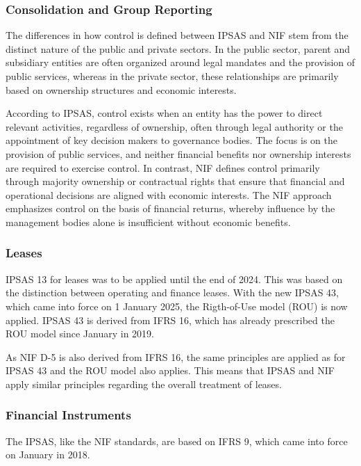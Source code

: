 \documentclass[10pt]{article}
\begin{document}
\subsubsection{Consolidation and Group Reporting}\label{subsubsec:consolidation_and_group_reporting}
The differences in how control is defined between IPSAS and NIF stem from the distinct nature of the public and private sectors. In the public sector, parent and subsidiary entities are often organized around legal mandates and the provision of public services, whereas in the private sector, these relationships are primarily based on ownership structures and economic interests.

According to IPSAS, control exists when an entity has the power to direct relevant activities, regardless of ownership, often through legal authority or the appointment of key decision makers to governance bodies. The focus is on the provision of public services, and neither financial benefits nor ownership interests are required to exercise control. In contrast, NIF defines control primarily through majority ownership or contractual rights that ensure that financial and operational decisions are aligned with economic interests. The NIF approach emphasizes control on the basis of financial returns, whereby influence by the management bodies alone is insufficient without economic benefits.

\subsubsection{Leases}\label{subsubsec:leases}
IPSAS 13 for leases was to be applied until the end of 2024. This was based on the distinction between operating and finance leases. With the new IPSAS 43, which came into force on 1 January 2025, the Rigth-of-Use model (ROU) is now applied. IPSAS 43 is derived from IFRS 16, which has already prescribed the ROU model since January in 2019.

As NIF D-5 is also derived from IFRS 16, the same principles are applied as for IPSAS 43 and the ROU model also applies. This means that IPSAS and NIF apply similar principles regarding the overall treatment of leases.

\subsubsection{Financial Instruments}\label{subsubsec:financial_instruments}
The IPSAS, like the NIF standards, are based on IFRS 9, which came into force on January in 2018.
\end{document}
